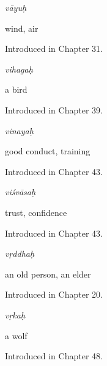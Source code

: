 \noindent\begin{minipage}[t]{\linewidth}
\raggedright
\textbf{}\enspace\emph{vāyuḥ}\par
\small wind, air\par
\footnotesize Introduced in Chapter 31.
\end{minipage}\par\medskip

\noindent\begin{minipage}[t]{\linewidth}
\raggedright
\textbf{}\enspace\emph{vihagaḥ}\par
\small a bird\par
\footnotesize Introduced in Chapter 39.
\end{minipage}\par\medskip

\noindent\begin{minipage}[t]{\linewidth}
\raggedright
\textbf{}\enspace\emph{vinayaḥ}\par
\small good conduct, training\par
\footnotesize Introduced in Chapter 43.
\end{minipage}\par\medskip

\noindent\begin{minipage}[t]{\linewidth}
\raggedright
\textbf{}\enspace\emph{viśvāsaḥ}\par
\small trust, confidence\par
\footnotesize Introduced in Chapter 43.
\end{minipage}\par\medskip

\noindent\begin{minipage}[t]{\linewidth}
\raggedright
\textbf{}\enspace\emph{vṛddhaḥ}\par
\small an old person, an elder\par
\footnotesize Introduced in Chapter 20.
\end{minipage}\par\medskip

\noindent\begin{minipage}[t]{\linewidth}
\raggedright
\textbf{}\enspace\emph{vṛkaḥ}\par
\small a wolf\par
\footnotesize Introduced in Chapter 48.
\end{minipage}\par\medskip

